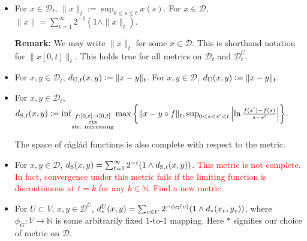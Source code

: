 \documentclass[12pt]{article}
\newcommand{\skipLine}{\vspace{12pt}}
\newcommand{\mb}{\mathbb}
\newcommand{\mc}{\mathcal}
\newcommand{\ra}{\rightarrow}
\newcommand{\te}{\text}
\newcommand{\tr}{\textcolor{red}}
\newcommand{\remark}{\textbf{Remark: }}
\newcommand{\defeq}{:=}								%
\newcommand{\cad}{\mc{D}}							%
\newcommand{\utmet}[1]{
\ifstrempty{#1}{
	d_{\te{U}}}{
	d_{\te{U},#1}}}									%
\newcommand{\stmet}[1]{
\ifstrempty{#1}{
	d_{\te{S}}}{
	d_{\te{S},#1}}}									%
\newcommand{\xf}{x}									%
\newcommand{\xg}{y}									%
\newcommand{\met}[2]{
\ifstrempty{#2}{
	d_{#1}}{
	d_{#1,#2}}}										%
\newcommand{\vind}[1]{_{#1}}						%
\newcommand{\tme}[1]{(#1)}							%
\newcommand{\tmi}[1]{#1}							%
\newcommand{\vpara}[1]{^{#1}}						%
\newcommand{\tpara}[1]{_{#1}}						%
\begin{document}
\begin{itemize}
\item For \(\xf \in \cad\tpara{t}\), \(\|\xf\|\tpara{t} \defeq \sup_{0\leq s \leq t} \xf\tme{s}\). For \(\xf \in \cad\), \(\|\xf\| = \sum_{t=1}^\infty 2^{-1}(1\wedge \|\xf\|\tpara{t})\).

\skipLine

\remark We may write \(\|\xf\|_t\) for some \(\xf \in \cad\). This is shorthand notation for \(\|\xf\tmi{[0,t]}\|_t\). This holds true for all metrics on \(\cad\tpara{t}\) and \(\cad\vpara{U}\tpara{t}\).

\skipLine 

\item For \(\xf,\xg \in \cad\tpara{t}\), \(\utmet{t}(\xf,\xg) \defeq \|\xf-\xg\|\tpara{t}\). For \(\xf,\xg \in \cad\), \(\utmet{}(\xf,\xg) \defeq \|\xf - \xg\|\tpara{t}\).

\item For \(\xf,\xg \in \cad\tpara{t}\), \(\stmet{t}(\xf,\xg)  \defeq \inf_{\substack{f:[0,t]\ra[0,t]\\\te{cts}\\\te{str. increasing}}}\max\left\{\|\xf-\xg\circ f\|\tpara{t},\sup_{0<s<s'<t}\left|\ln \frac{f(s') -f(s)}{s-s'}\right|\right\}\).

The space of c\`agl\`ad functions is also complete with respect to the metric.

\item For \(\xf,\xg \in \cad\), \(\stmet{}(\xf,\xg) = \sum_{t=1}^\infty 2^{-t}(1\wedge \stmet{t}(\xf,\xg))\). \tr{This metric is not complete. In fact, convergence under this metric fails if the limiting function is discontinuous at \(t = k\) for any \(k \in \mb{N}\). Find a new metric.}

\item For \(U \subset V\), \(\xf,\xg\in \cad\vpara{U}\), \(\met{\ast}{}\vpara{U}(\xf,\xg) = \sum_{v \in U} 2^{-\phi_G(v)}(1\wedge \met{\ast}{}(\xf\vind{v},\xg\vind{v}))\), where \(\phi_G: V \ra \mb{N}\) is some arbitrarily fixed 1-to-1 mapping. Here \(\ast\) signifies our choice of metric on \(\cad\).
\end{itemize}
\end{document}
